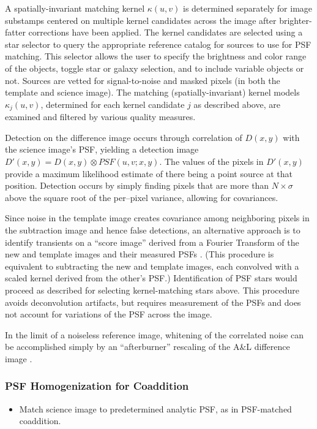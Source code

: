 A spatially-invariant matching kernel $\kappa(u,v)$ is determined separately for image substamps centered on multiple kernel candidates across the image after brighter-fatter corrections have been applied.  The kernel candidates are selected using a star selector to query the appropriate reference catalog for sources to use for PSF matching. This selector allows the user to specify the brightness and color range of the objects, toggle star or galaxy selection, and to include variable objects or not. Sources are vetted for signal-to-noise and masked pixels (in both the template and science image). The matching (spatially-invariant) kernel models $\kappa_j(u,v)$, determined for each kernel candidate $j$ as described above, are examined and filtered by various quality measures.

Detection on the difference image occurs through correlation of $D(x,y)$ with the science image's PSF, yielding a detection image $D'(x,y) = D(x,y) \otimes PSF(u,v;x,y)$. The values of the pixels in $D'(x,y)$ provide a maximum likelihood estimate of there being a point source at that position.  Detection occurs by simply finding pixels that are more than $N \times \sigma$ above the square root of the per--pixel variance, allowing for covariances.

Since noise in the template image creates
covariance among neighboring pixels in the subtraction image and hence
false detections,
an alternative approach is to
identify transients on a
``score image'' derived from a Fourier Transform of the new and template
images and their measured PSFs \citep{2016ApJ...830...27Z}.
(This procedure is equivalent to
subtracting the new and template images, each convolved with a scaled
kernel derived from the other's PSF.)
Identification of PSF stars would
proceed as described for selecting kernel-matching stars above.  This
procedure avoids deconvolution artifacts, but requires measurement of the
PSFs and does not account for variations of the PSF across the image.

In the limit of a noiseless reference image, whitening of the correlated
noise can be accomplished simply by
an ``afterburner'' rescaling of the A\&L difference image .

\subsubsection{PSF Homogenization for Coaddition}
\label{sec:acPSFHomogenization}
\begin{itemize}
\item Match science image to predetermined analytic PSF, as in PSF-matched coaddition.
\end{itemize}

